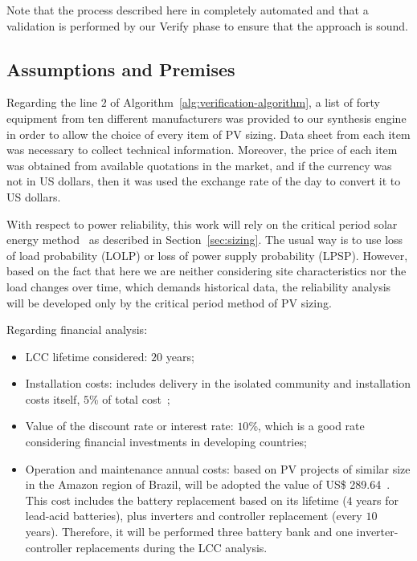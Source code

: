 \documentclass[journal]{IEEEtran}
\begin{document}
Note that the process described here in completely automated and that a validation is performed 
by our {\sc Verify} phase to ensure that the approach is sound.

\subsection{Assumptions and Premises}

Regarding the line $2$ of Algorithm~\ref{alg:verification-algorithm}, 
a list of forty equipment from ten different manufacturers was provided 
to our synthesis engine in order to allow the choice of every item 
of PV sizing. Data sheet from each item was necessary to collect 
technical information. Moreover, the price of each item was obtained 
from available quotations in the market, and if the currency was not in US dollars, 
then it was used the exchange rate of the day to convert it to US dollars.

With respect to power reliability, this work will rely on the critical period solar 
energy method~\cite{Pinho} as described in Section~\ref{sec:sizing}. 
The usual way is to use loss of load probability (LOLP) or loss of power 
supply probability (LPSP). However, based on the fact that here we 
are neither considering site characteristics nor the load changes over time, 
which demands historical data, the reliability analysis will be developed only 
by the critical period method of PV sizing.

Regarding financial analysis:
\begin{itemize}
	\item LCC lifetime considered: $20$ years;
	\item Installation costs: includes delivery in the isolated community and installation costs itself, $5$\% of total cost~\cite{Agrener2013};
	\item Value of the discount rate or interest rate: $10$\%, which is a good rate considering financial investments in developing countries;
	\item Operation and maintenance annual costs: based on PV projects of similar size in the Amazon region of Brazil, will be adopted the value of US\$ 289.64~\cite{Agrener2013}. This cost includes the battery replacement based on its lifetime ($4$ years for lead-acid batteries), plus inverters and controller replacement (every $10$ years). Therefore, it will be performed three battery bank and one inverter-controller replacements during the LCC analysis.
\end{itemize}
\end{document}
